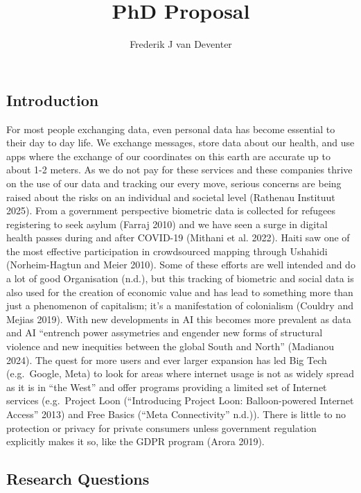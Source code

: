 \documentclass[
  letterpaper,
  DIV=11,
  numbers=noendperiod]{scrartcl}
\title{PhD Proposal}
\author{Frederik J van Deventer}
\date{}
\begin{document}
\maketitle


\subsection{Introduction}\label{introduction}

For most people exchanging data, even personal data has become essential
to their day to day life. We exchange messages, store data about our
health, and use apps where the exchange of our coordinates on this earth
are accurate up to about 1-2 meters. As we do not pay for these services
and these companies thrive on the use of our data and tracking our every
move, serious concerns are being raised about the risks on an individual
and societal level (Rathenau Instituut 2025). From a government
perspective biometric data is collected for refugees registering to seek
asylum (Farraj 2010) and we have seen a surge in digital health passes
during and after COVID-19 (Mithani et al. 2022). Haiti saw one of the
most effective participation in crowdsourced mapping through Ushahidi
(Norheim-Hagtun and Meier 2010). Some of these efforts are well intended
and do a lot of good Organisation (n.d.), but this tracking of biometric
and social data is also used for the creation of economic value and has
lead to something more than just a phenomenon of capitalism; it's a
manifestation of colonialism (Couldry and Mejias 2019). With new
developments in AI this becomes more prevalent as data and AI ``entrench
power assymetries and engender new forms of structural violence and new
inequities between the global South and North'' (Madianou 2024). The
quest for more users and ever larger expansion has led Big Tech
(e.g.~Google, Meta) to look for areas where internet usage is not as
widely spread as it is in ``the West'' and offer programs providing a
limited set of Internet services (e.g.~Project Loon ({``Introducing
{Project Loon}: {Balloon-powered Internet} Access''} 2013) and Free
Basics ({``Meta {Connectivity}''} n.d.)). There is little to no
protection or privacy for private consumers unless government regulation
explicitly makes it so, like the GDPR program (Arora 2019).

\subsection{Research Questions}\label{research-questions}
\end{document}
